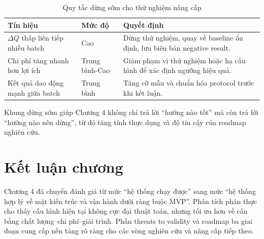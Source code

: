 \begin{table}[H]
\caption{Quy tắc dừng sớm cho thử nghiệm nâng cấp}
\centering
\begin{tabularx}{\textwidth}{p{}p{}X}
\toprule
\textbf{Tín hiệu} & \textbf{Mức độ} & \textbf{Quyết định}\\
\midrule
$\Delta Q$ thấp liên tiếp nhiều batch & Cao & Dừng thử nghiệm, quay về baseline ổn định, lưu biên bản negative result.\\
Chi phí tăng nhanh hơn lợi ích & Trung bình-Cao & Giảm phạm vi thử nghiệm hoặc hạ cấu hình để xác định ngưỡng hiệu quả.\\
Kết quả dao động mạnh giữa batch & Trung bình & Tăng cỡ mẫu và chuẩn hóa protocol trước khi kết luận.\\
\bottomrule
\end{tabularx}
\end{table}

Khung dừng sớm giúp Chương 4 không chỉ trả lời ``hướng nào tốt'' mà còn trả lời ``hướng nào nên dừng'', từ đó tăng tính thực dụng và độ tin cậy của roadmap nghiên cứu.

\section{Kết luận chương}

Chương 4 đã chuyển đánh giá từ mức ``hệ thống chạy được'' sang mức ``hệ thống hợp lý về mặt kiến trúc và vận hành dưới ràng buộc MVP''. Phân tích phản thực cho thấy cấu hình hiện tại không cực đại thuật toán, nhưng tối ưu hơn về cân bằng chất lượng--chi phí--giải trình. Phần threats to validity và roadmap ba giai đoạn cung cấp nền tảng rõ ràng cho các vòng nghiên cứu và nâng cấp tiếp theo.
